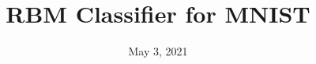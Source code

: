 \documentclass[10pt]{beamer}
\date{May 3, 2021}
\title{RBM Classifier for MNIST}
\begin{document}
\frame{\titlepage}
\begin{comment}
\begin{frame}[fragile]{RBM Classifier}
\begin{columns}
\begin{column}{.5\textwidth}
\textbf{Model}
\begin{itemize}
\item Visible units $\mathbf{x}$ (input).\\
\textcolor{gray}{Size: $28\times28\implies 784$.}
\item Half-visible units $\textcolor{mythemecolor}{\mathbf{y}}$ (output).\\
\textcolor{gray}{Size: $10$.}
\item Hidden units $\textcolor{orange}{\mathbf{h}}$.\\
\textcolor{gray}{Size: $100$.}
\end{itemize}
\vspace{1em}
\textbf{Energy}
\newcommand{\param}[1]{\textcolor{violet}{\mathbf{#1}}}
\begin{align*}
E(\mathbf{x},\mathbf{y},\mathbf{h})=&-\mathbf{h}^t\param{W}\mathbf{x}-\mathbf{h}^t\param{U}\mathbf{y}-\\&-\param{b}^t\mathbf{x}-\param{c}^t\mathbf{h}-\param{d}^t\mathbf{y}
\end{align*}
\end{column}
\begin{column}{.5\textwidth}
\centering
\begin{tikzpicture}[z={(0.5,0.5)}]
\pgfplotstableread[header=false]{pictures/input_digit_1.txt}{\inputtable}
\pic (input-layer) at (-0.12*14,0,-0.12*14) {neuron grid={width=28,height=28,size=0.12cm,color/.style 2 args={/utils/exec={\tikzmath{\idx=int(#1+28*(27-#2));}\pgfplotstablegetelem{\idx}{0}\of\inputtable\tikzmath{\intensity=int(100*\pgfplotsretval);}},white!\intensity!black},grid lines/.style={gray,line width=0.2pt,opacity=.5},boundary/.style={gray,line width=0.5pt,line join=round}}};
\pic (hidden-layer) at (-0.25*5,1.5,-0.25*5) {neuron grid={width=10,height=10,size=0.25cm,color/.style 2 args={/utils/exec={\pgfmathparse{random(100)}},orange!\pgfmathresult},grid lines/.style={black!70,line width=0.3pt,opacity=.7},boundary/.style={black,line width=.6pt,line join=round}}};
\pic (output-layer) at (-0.3*5,3,-0.3*0.5) {neuron grid={width=10,height=1,size=0.3cm,color/.style 2 args={/utils/exec={\tikzmath{\intensity=int(max(0,min(100,(#1==3)*100+random(-40,40))));}},mythemecolor!\intensity},grid lines/.style={black!70,line width=0.3pt},boundary/.style={black,line width=.6pt,line join=round}}};

\end{comment}
\end{document}
